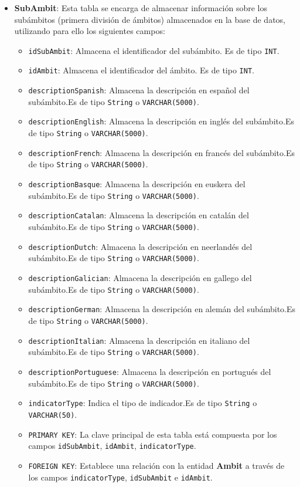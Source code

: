 \begin{itemize}

    \item \textbf{SubAmbit}: Esta tabla se encarga de almacenar información sobre los subámbitos (primera división de ámbitos) almacenados en la base de datos, utilizando para ello los siguientes campos:
        \begin{itemize}
        \item \texttt{idSubAmbit}: Almacena el identificador del subámbito. Es de tipo \texttt{INT}.
        \item \texttt{idAmbit}: Almacena el identificador del ámbito. Es de tipo \texttt{INT}.
        \item \texttt{descriptionSpanish}: Almacena la descripción en español del subámbito.Es de tipo \texttt{String} o \texttt{VARCHAR(5000)}.
        \item \texttt{descriptionEnglish}: Almacena la descripción en inglés del subámbito.Es de tipo \texttt{String} o \texttt{VARCHAR(5000)}.
        \item \texttt{descriptionFrench}: Almacena la descripción en francés del subámbito.Es de tipo \texttt{String} o \texttt{VARCHAR(5000)}.
        \item \texttt{descriptionBasque}: Almacena la descripción en euskera del subámbito.Es de tipo \texttt{String} o \texttt{VARCHAR(5000)}.
        \item \texttt{descriptionCatalan}: Almacena la descripción en catalán del subámbito.Es de tipo \texttt{String} o \texttt{VARCHAR(5000)}.
        \item \texttt{descriptionDutch}: Almacena la descripción en neerlandés del subámbito.Es de tipo \texttt{String} o \texttt{VARCHAR(5000)}.
        \item \texttt{descriptionGalician}: Almacena la descripción en gallego del subámbito.Es de tipo \texttt{String} o \texttt{VARCHAR(5000)}.
        \item \texttt{descriptionGerman}: Almacena la descripción en alemán del subámbito.Es de tipo \texttt{String} o \texttt{VARCHAR(5000)}.
        \item \texttt{descriptionItalian}: Almacena la descripción en italiano del subámbito.Es de tipo \texttt{String} o \texttt{VARCHAR(5000)}.
        \item \texttt{descriptionPortuguese}: Almacena la descripción en portugués del subámbito.Es de tipo \texttt{String} o \texttt{VARCHAR(5000)}.
        \item \texttt{indicatorType}: Indica el tipo de indicador.Es de tipo \texttt{String} o \texttt{VARCHAR(50)}.
        \item \texttt{PRIMARY KEY}: La clave principal de esta tabla está compuesta por los campos \texttt{idSubAmbit}, \texttt{idAmbit}, \texttt{indicatorType}.
        \item \texttt{FOREIGN KEY}: Establece una relación con la entidad \textbf{Ambit} a través de los campos \texttt{indicatorType}, \texttt{idSubAmbit} e \texttt{idAmbit}.
        \end{itemize}


\end{itemize}
